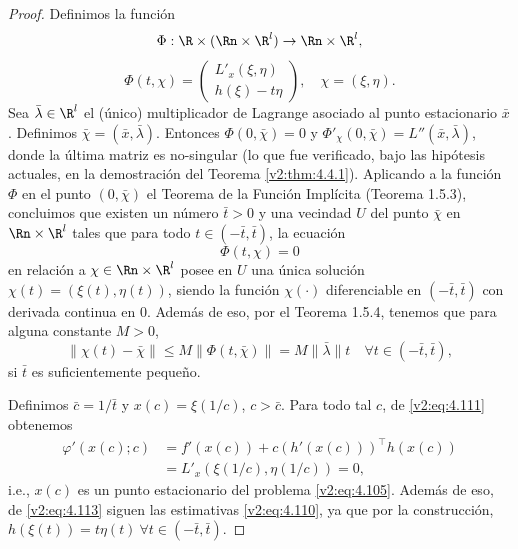 \begin{proof}
    Definimos la función
    \[
        \Phi: \R \times (\Rn \times \R^l) \to \Rn \times \R^l,
    \]
    \begin{equation}
        \Phi(t, \chi) = \begin{pmatrix} L'_x(\xi, \eta) \\ h(\xi) - t\eta \end{pmatrix}, \quad \chi = (\xi, \eta).
        \label{v2:eq:4.111}
    \end{equation}
    Sea $\bar{\lambda} \in \R^l$ el (único) multiplicador de Lagrange asociado al punto estacionario $\bar{x}$. Definimos $\bar{\chi} = (\bar{x}, \bar{\lambda})$. Entonces $\Phi(0, \bar{\chi}) = 0$ y $\Phi'_\chi(0, \bar{\chi}) = L''(\bar{x}, \bar{\lambda})$, donde la última matriz es no-singular (lo que fue verificado, bajo las hipótesis actuales, en la demostración del Teorema \ref{v2:thm:4.4.1}). Aplicando a la función $\Phi$ en el punto $(0, \bar{\chi})$ el Teorema de la Función Implícita (Teorema 1.5.3), concluimos que existen un número $\bar{t} > 0$ y una vecindad $U$ del punto $\bar{\chi}$ en $\Rn \times \R^l$ tales que para todo $t \in (-\bar{t}, \bar{t})$, la ecuación
    \begin{equation}
        \Phi(t, \chi) = 0
        \label{v2:eq:4.112}
    \end{equation}
    en relación a $\chi \in \Rn \times \R^l$ posee en $U$ una única solución $\chi(t) = (\xi(t), \eta(t))$, siendo la función $\chi(\cdot)$ diferenciable en $(-\bar{t}, \bar{t})$ con derivada continua en $0$. Además de eso, por el Teorema 1.5.4, tenemos que para alguna constante $M > 0$,
    \begin{equation}
        \|\chi(t) - \bar{\chi}\| \le M \|\Phi(t, \bar{\chi})\| = M \|\bar{\lambda}\| t \quad \forall t \in (-\bar{t}, \bar{t}),
        \label{v2:eq:4.113}
    \end{equation}
    si $\bar{t}$ es suficientemente pequeño.
    
    Definimos $\bar{c} = 1/\bar{t}$ y $x(c) = \xi(1/c)$, $c > \bar{c}$. Para todo tal $c$, de \eqref{v2:eq:4.111} obtenemos
    \begin{align*}
        \varphi'(x(c); c) &= f'(x(c)) + c(h'(x(c)))^\top h(x(c)) \\
        &= L'_x(\xi(1/c), \eta(1/c)) = 0,
    \end{align*}
    i.e., $x(c)$ es un punto estacionario del problema \eqref{v2:eq:4.105}. Además de eso, de \eqref{v2:eq:4.113} siguen las estimativas \eqref{v2:eq:4.110}, ya que por la construcción, $h(\xi(t)) = t \eta(t) \ \forall t \in (-\bar{t}, \bar{t})$.
    

\end{proof}

